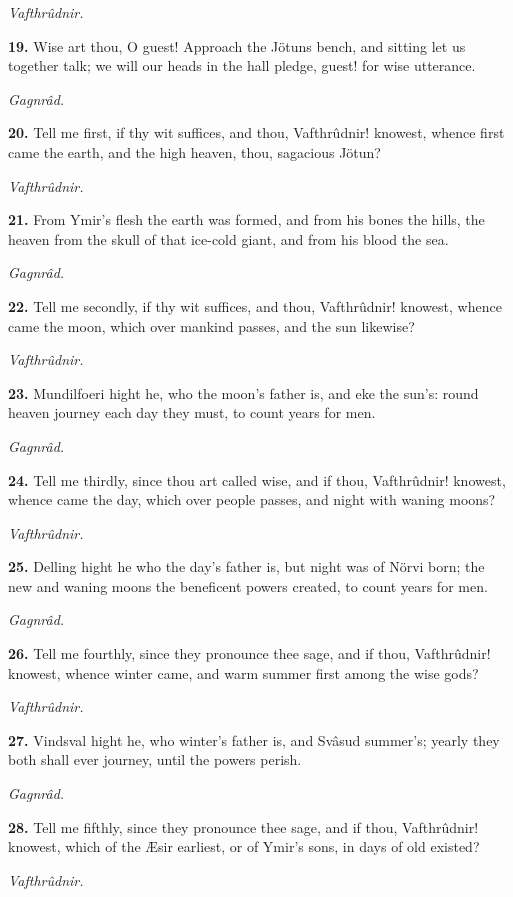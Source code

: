 \emph{Vafthrûdnir.}

\textbf{19.} Wise art thou, O guest! Approach the Jötuns bench, and sitting
let us together talk; we will our heads in the hall pledge, guest! for
wise utterance.

\emph{Gagnrâd.}

\textbf{20.} Tell me first, if thy wit suffices, and thou, Vafthrûdnir!
knowest, whence first came the earth, and the high heaven, thou,
sagacious Jötun?

\emph{Vafthrûdnir.}

\textbf{21.} From Ymir's flesh the earth was formed, and from his bones the
hills, the heaven from the skull of that ice-cold giant, and from his
blood the sea.

\emph{Gagnrâd.}

\textbf{22.} Tell me secondly, if thy wit suffices, and thou, Vafthrûdnir!
knowest, whence came the moon, which over mankind passes, and the sun
likewise?

\emph{Vafthrûdnir.}

\textbf{23.} Mundilfoeri hight he, who the moon's father is, and eke the
sun's: round heaven journey each day they must, to count years for
men.

\emph{Gagnrâd.}

\textbf{24.} Tell me thirdly, since thou art called wise, and if thou,
Vafthrûdnir! knowest, whence came the day, which over people passes,
and night with waning moons?

\emph{Vafthrûdnir.}

\textbf{25.} Delling hight he who the day's father is, but night was of Nörvi
born; the new and waning moons the beneficent powers created, to count
years for men.

\emph{Gagnrâd.}

\textbf{26.} Tell me fourthly, since they pronounce thee sage, and if thou,
Vafthrûdnir! knowest, whence winter came, and warm summer first among
the wise gods?

\emph{Vafthrûdnir.}

\textbf{27.} Vindsval hight he, who winter's father is, and Svâsud summer's;
yearly they both shall ever journey, until the powers perish.

\emph{Gagnrâd.}

\textbf{28.} Tell me fifthly, since they pronounce thee sage, and if thou,
Vafthrûdnir! knowest, which of the Æsir earliest, or of Ymir's sons,
in days of old existed?

\emph{Vafthrûdnir.}

